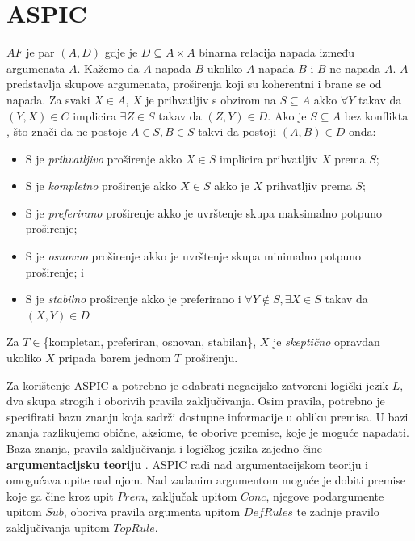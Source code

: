 \section{ASPIC}
\label{sec:aspic}

$AF$ je par $(A, D)$ gdje je $D \subseteq A \times A$ binarna relacija napada između argumenata $A$. 
Kažemo da $A$ napada $B$ ukoliko $A$ napada $B$ i $B$ ne napada $A$. $A$ 
predstavlja skupove argumenata, proširenja 
koji su koherentni i brane se od napada. 
Za svaki $X \in A$, $X$ je prihvatljiv s obzirom na $S \subseteq A$ akko
$\forall Y$ takav da $(Y, X) \in C$ implicira $\exists Z \in S$ takav da
$(Z, Y) \in D$. Ako je $S \subseteq A$ bez konflikta , što znači 
da ne postoje $A \in S, B \in S$ takvi da postoji $(A, B) \in D$ onda:
\begin{itemize}
    \item S je \emph{prihvatljivo} proširenje akko $X \in S$ implicira prihvatljiv $X$ prema $S$;
    \item S je \emph{kompletno} proširenje akko $X \in S$ akko je $X$ prihvatljiv prema $S$;
    \item S je \emph{preferirano} proširenje akko je uvrštenje skupa maksimalno potpuno proširenje; 
    \item S je \emph{osnovno} proširenje akko je uvrštenje skupa minimalno potpuno proširenje; i
    \item S je \emph{stabilno} proširenje akko je preferirano i $\forall Y \notin S, \exists X \in S$ takav da
        $(X, Y) \in D$
\end{itemize}
Za $T \in $\{kompletan, preferiran, osnovan, stabilan\}, $X$ je
\emph{skeptično} opravdan ukoliko $X$ pripada barem jednom $T$ proširenju. 

Za korištenje ASPIC-a potrebno je odabrati negacijsko-zatvoreni logički jezik $L$,
dva skupa strogih  i oborivih  pravila
zaključivanja. 
Osim pravila, potrebno je specifirati bazu znanju 
 koja sadrži dostupne informacije u obliku premisa. 
U bazi znanja razlikujemo obične, aksiome, te oborive premise, koje je moguće
napadati. Baza znanja, pravila zaključivanja i logičkog jezika
zajedno čine \textbf{argumentacijsku teoriju} .
ASPIC radi nad argumentacijskom teoriju i omogućava upite nad njom. 
Nad zadanim argumentom moguće je dobiti premise koje ga čine kroz
upit $Prem$, zaključak upitom $Conc$, 
njegove podargumente upitom $Sub$, oboriva pravila argumenta upitom $DefRules$ te
zadnje pravilo zaključivanja upitom $TopRule$. 


